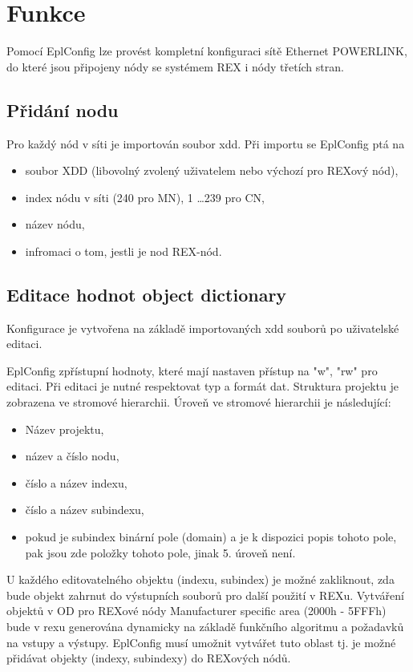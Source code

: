 %
%
\section{Funkce}
Pomocí EplConfig lze provést kompletní konfiguraci sítě Ethernet POWERLINK, 
do které jsou připojeny nódy se systémem REX i nódy třetích stran. 

\subsection{Přidání nodu}
Pro každý nód v síti je importován soubor xdd. Při importu se EplConfig ptá na
\begin{itemize}
\item soubor XDD (libovolný zvolený uživatelem nebo výchozí pro REXový nód),
\item index nódu v síti (240 pro MN), 1 \ldots 239 pro CN,
\item název nódu,
\item infromaci o tom, jestli je nod REX-nód.
\end{itemize}

\subsection{Editace hodnot object dictionary}
Konfigurace je vytvořena na základě importovaných xdd souborů po uživatelské editaci.

EplConfig zpřístupní hodnoty, které mají nastaven přístup na "w", "rw" pro editaci. 
Při editaci je nutné respektovat typ a formát dat.
Struktura projektu je zobrazena ve stromové hierarchii. 
Úroveň ve stromové hierarchii je následující:
\begin{itemize}
\item Název projektu,
\item název a číslo nodu,
\item číslo a název indexu,
\item číslo a název subindexu,
\item pokud je subindex binární pole (domain) a je k dispozici popis tohoto pole, 
pak jsou zde položky tohoto pole, jinak 5. úroveň není.
\end{itemize}

U každého editovatelného objektu (indexu, subindex) je možné zakliknout, 
zda bude objekt zahrnut do výstupních souborů pro další použití v REXu.
Vytváření objektů v OD pro REXové nódy
Manufacturer specific area (2000h - 5FFFh) bude v rexu generována dynamicky 
na základě funkčního algoritmu a požadavků na vstupy a výstupy. 
EplConfig musí umožnit vytvářet tuto oblast tj. 
je možné přidávat objekty (indexy, subindexy) do REXových nódů.

